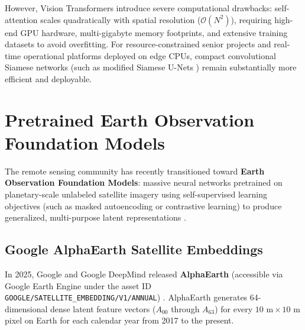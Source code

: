 However, Vision Transformers introduce severe computational drawbacks: self-attention scales quadratically with spatial resolution ($\mathcal{O}(N^2)$), requiring high-end GPU hardware, multi-gigabyte memory footprints, and extensive training datasets to avoid overfitting. For resource-constrained senior projects and real-time operational platforms deployed on edge CPUs, compact convolutional Siamese networks (such as modified Siamese U-Nets \citep{ronneberger2015unet}) remain substantially more efficient and deployable.

\section{Pretrained Earth Observation Foundation Models}
\label{sec:lit_foundation_models}
The remote sensing community has recently transitioned toward \textbf{Earth Observation Foundation Models}: massive neural networks pretrained on planetary-scale unlabeled satellite imagery using self-supervised learning objectives (such as masked autoencoding or contrastive learning) to produce generalized, multi-purpose latent representations \citep{brown2025alphaearth, zhang2026sigmae}.

\subsection{Google AlphaEarth Satellite Embeddings}
In 2025, Google and Google DeepMind released \textbf{AlphaEarth} (accessible via Google Earth Engine under the asset ID \texttt{GOOGLE/SATELLITE\_EMBEDDING/V1/ANNUAL}) \citep{brown2025alphaearth}. AlphaEarth generates 64-dimensional dense latent feature vectors ($A_{00}$ through $A_{63}$) for every $10\text{ m} \times 10\text{ m}$ pixel on Earth for each calendar year from 2017 to the present.

